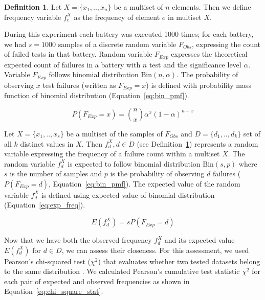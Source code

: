 \documentclass[
	digital,    %
	oneside,    %
	color,
	11pt,
	nocover,
	notable,
	nolof,
	nolot,
]{fithesis3}
\theoremstyle{definition}
\newtheorem{definition}{Definition}[section]
\theoremstyle{remark}
\begin{document}
\begin{definition}
\label{def:freq}
Let $X = \{x_1, .. ,x_n\}$ be a multiset of $n$ elements. Then we define frequency variable $f_{e}^{X}$ as the frequency of element $e$ in multiset $X$.
\end{definition}

During this experiment each battery was executed 1000 times; for each battery, we had $s = 1000$ samples of a discrete random variable $F_{Obs}$, expressing the count of failed tests in that battery. Random variable $F_{Exp}$ expresses the theoretical expected count of failures in a battery with $n$ test and the significance level $\alpha$. Variable $F_{Exp}$ follows binomial distribution $\text{Bin}(n, \alpha)$. The probability of observing $x$ test failures (written as $F_{Exp} = x$) is defined with probability mass function of binomial distribution (Equation~\ref{eq:bin_pmf}).

\begin{equation}
\label{eq:bin_pmf}
P(F_{Exp} = x) = \binom nx \alpha^x (1-\alpha)^{n-x} 
\end{equation}

Let $X = \{x_1,..,x_s\}$ be a multiset of the samples of $F_{Obs}$ and $D = \{d_1,..,d_k\}$ set of all $k$ distinct values in $X$. Then $f_{d}^{X}, d \in D$ (see Definition~\ref{def:freq}) represents a random variable expressing the frequency of a failure count within a multiset $X$. The random variable $f_{d}^{X}$ is expected to follow binomial distribution $\text{Bin}(s, p)$ where $s$ is the number of samples and $p$ is the probability of observing $d$ failures ($P(F_{Exp} = d)$, Equation~\ref{eq:bin_pmf}). The expected value of the random variable $f_{d}^{X}$ is defined using expected value of binomial distribution (Equation~\ref{eq:exp_freq}).

\begin{equation}
\label{eq:exp_freq}
E\left(f_{d}^{X}\right) = s P(F_{Exp} = d)
\end{equation}

Now that we have both the observed frequency $f_{d}^{X}$ and its expected value $E\left(f_{d}^{X}\right)$ for $d \in D$, we can assess their closeness. For this assessment, we used Pearson's chi-squared test ($\chi^2$) that evaluates whether two tested datasets belong to the same distribution \cite[p.~219]{stat-handbook}. We calculated Pearson's cumulative test statistic $\chi^2$ for each pair of expected and observed frequencies as shown in Equation~\ref{eq:chi_square_stat}.
\end{document}
